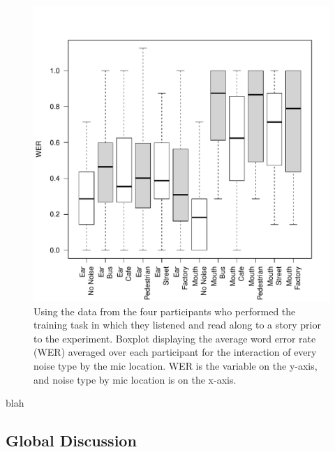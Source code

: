 \documentclass[dissertation,copyright]{uathesis}
\makeatletter
\def\maxwidth{ %
  \ifdim\Gin@nat@width>\linewidth
    \linewidth
  \else
    \Gin@nat@width
  \fi
}
\makeatother
\begin{document}
\begin{figure}

\includegraphics[width=\maxwidth]{figure/perc_boxplot_noiseXmic-1} 

\caption{Using the data from the four participants who performed the training task in which they listened and read along to a story prior to the experiment. Boxplot displaying the average word error rate (WER) averaged over each participant for the interaction of every noise type by the mic location. WER is the variable on the y-axis, and noise type by mic location is on the x-axis.}
\label{fig:perc_noiseXmic_boxplot}
\end{figure}

blah

\subsection{Global Discussion}
\end{document}
